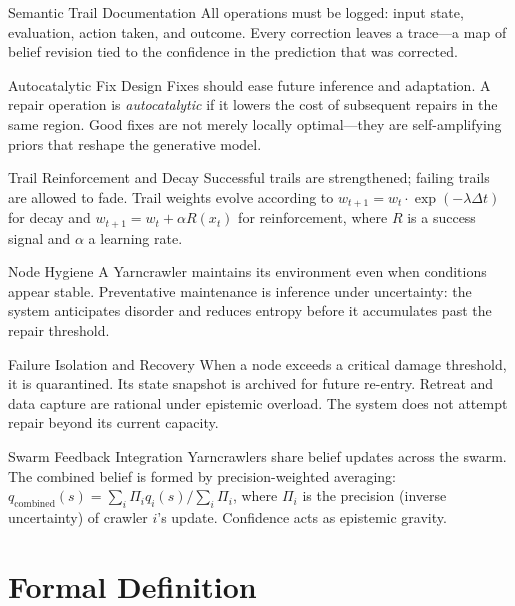 \begin{axiom}{Semantic Trail Documentation}
All operations must be logged: input state, evaluation, action taken, and outcome.
Every correction leaves a trace---a map of belief revision tied to the confidence
in the prediction that was corrected.
\end{axiom}

\begin{axiom}{Autocatalytic Fix Design}
Fixes should ease future inference and adaptation. A repair operation is
\emph{autocatalytic} if it lowers the cost of subsequent repairs in the same
region. Good fixes are not merely locally optimal---they are self-amplifying
priors that reshape the generative model.
\end{axiom}

\begin{axiom}{Trail Reinforcement and Decay}
Successful trails are strengthened; failing trails are allowed to fade. Trail
weights evolve according to $w_{t+1} = w_t \cdot \exp(-\lambda \Delta t)$ for
decay and $w_{t+1} = w_t + \alpha R(x_t)$ for reinforcement, where $R$ is a
success signal and $\alpha$ a learning rate.
\end{axiom}

\begin{axiom}{Node Hygiene}
A Yarncrawler maintains its environment even when conditions appear stable.
Preventative maintenance is inference under uncertainty: the system anticipates
disorder and reduces entropy before it accumulates past the repair threshold.
\end{axiom}

\begin{axiom}{Failure Isolation and Recovery}
When a node exceeds a critical damage threshold, it is quarantined. Its state
snapshot is archived for future re-entry. Retreat and data capture are rational
under epistemic overload. The system does not attempt repair beyond its current
capacity.
\end{axiom}

\begin{axiom}{Swarm Feedback Integration}
Yarncrawlers share belief updates across the swarm. The combined belief is formed
by precision-weighted averaging: $q_{\text{combined}}(s) = \sum_i \Pi_i q_i(s) /
\sum_i \Pi_i$, where $\Pi_i$ is the precision (inverse uncertainty) of crawler
$i$'s update. Confidence acts as epistemic gravity.
\end{axiom}

\section{Formal Definition}

